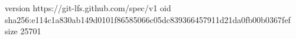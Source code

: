 version https://git-lfs.github.com/spec/v1
oid sha256:e114c1a830ab149d0101f86585066c05dc839366457911d21da0fb00b0367fef
size 25701
